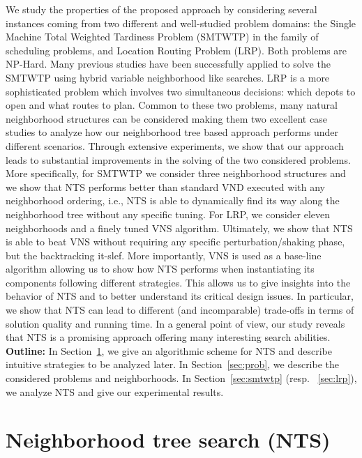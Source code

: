 \documentclass{acm_proc_article-sp}
\begin{document}
We study the properties of the proposed approach by considering several instances coming from two different and well-studied problem domains: the Single Machine Total Weighted Tardiness Problem (SMTWTP) in the family of scheduling problems, and Location Routing Problem (LRP). Both problems are NP-Hard. Many previous studies have been successfully applied to solve the SMTWTP using hybrid variable neighborhood like searches. LRP is a more sophisticated problem which involves two simultaneous decisions: which depots to open and what routes to plan. Common to these two problems, many natural neighborhood structures can be considered making them two excellent case studies to analyze how our neighborhood tree based approach performs under different scenarios. Through extensive experiments, we show that our approach leads to substantial improvements in the solving of the two considered problems. More specifically, for SMTWTP we consider three neighborhood structures and we show that NTS performs better than standard VND executed with any neighborhood ordering, i.e., NTS is able to dynamically find its way along the neighborhood tree without any specific tuning. For LRP, we  consider eleven neighborhoods and a finely tuned VNS algorithm. Ultimately, we show that NTS is able to beat VNS without requiring any specific perturbation/shaking phase, but the backtracking it-slef. More importantly, VNS is used as a base-line algorithm allowing us to show how NTS performs when instantiating its components following different strategies. This allows us to give insights into the behavior of NTS and to better understand its critical design issues. In particular, we show that NTS can lead to different (and incomparable) trade-offs in terms of solution quality and running time. In a general point of view, our study reveals that NTS is a promising approach offering many interesting search abilities.\\
\textbf{Outline:} In Section~\ref{sec:nts}, we give an algorithmic scheme for NTS and describe intuitive strategies to be analyzed later. In Section~\ref{sec:prob}, we describe the considered problems and neighborhoods. In Section~\ref{sec:smtwtp} (resp. ~\ref{sec:lrp}), we analyze NTS and give our experimental results.


\section{Neighborhood tree search (NTS)}\label{sec:nts}
\end{document}
